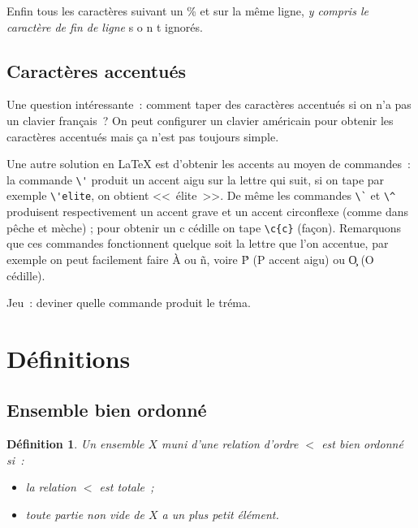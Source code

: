 \documentclass{article}
\newtheorem{de}{Définition}[subsection] %
\begin{document}
Enfin tous les caractères suivant un \% et sur la même ligne,
\emph{y compris le caractère de fin de ligne} s%
o%
n%
t %
ignorés.

\subsection{Caractères accentués}
Une question intéressante~: comment taper des caractères accentués si on n'a
pas un clavier français~? On peut configurer un clavier américain pour obtenir
les caractères accentués mais ça n'est pas toujours simple.

Une autre solution en \LaTeX{} est d'obtenir les accents au moyen de
commandes~: la commande \verb|\'| produit un accent aigu sur la lettre qui
suit, si on tape par exemple \verb|\'elite|, on obtient <<~\'elite~>>. De même
les commandes \verb|\`| et \verb|\^| produisent respectivement un accent grave
et un accent circonflexe (comme dans p\^eche et m\`eche) ; pour obtenir un c
cédille on tape \verb|\c{c}| (fa\c{c}on). Remarquons que ces commandes
fonctionnent quelque soit la lettre que l'on accentue, par exemple on peut
facilement faire \`A ou \~n, voire \'P (P accent aigu) ou \c{O} (O cédille).

Jeu~: deviner quelle commande produit le tréma.

\section{Définitions}
\subsection{Ensemble bien ordonné}


\begin{de}
Un ensemble $X$ muni d'une relation d'ordre $<$ est \emph{bien ordonné} si~:
\begin{itemize}
\item la relation $<$ est totale~;
\item toute partie non vide de $X$ a un plus petit élément.
\end{itemize}
\end{de}
\end{document}
